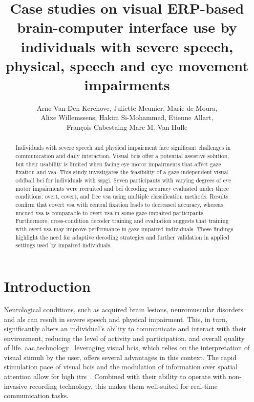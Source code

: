 \documentclass[twocolumn]{article}
\author{
	Arne Van Den Kerchove,
	Juliette Meunier,
	Marie de Moura, \\
	Alixe Willemssens,
	Hakim Si-Mohammed,
	Etienne Allart, \\
	François Cabestaing
	Marc M. Van Hulle
}
\title{Case studies on visual ERP-based brain-computer interface use by
	individuals with severe speech, physical, speech and eye movement impairments}
\begin{document}
\maketitle







\begin{abstract}
	Individuals with severe speech and physical impairment face significant challenges in
	communication and	daily interaction.
	Visual \acp{bci} offer a potential assistive solution, but their usability is
	limited when facing eye motor impairments that affect gaze fixation
	and \ac{vsa}.
	This study investigates the feasibility of a gaze-independent visual oddball
	\ac{bci} for individuals with \ac{sspgi}.
	Seven participants with varying degrees of eye motor impairments were
	recruited and \ac{bci} decoding accuracy evaluated under three conditions:
	overt, covert, and free \ac{vsa} using multiple classification methods.
	Results confirm that covert \ac{vsa} with central fixation leads to decreased
	accuracy, whereas uncued \ac{vsa} is comparable to overt \ac{vsa} in some
	gaze-impaired participants.
	Furthermore, cross-condition decoder training and evaluation suggests that training
	with overt \ac{vsa} may improve performance in gaze-impaired individuals.
	These findings highlight the need for adaptive decoding strategies and further
	validation in applied settings used by impaired individuals.
\end{abstract}

\acresetall
\section{Introduction}
Neurological conditions, such as acquired brain lesions,
neuromuscular disorders and \ac{als} can result in severe speech and physical impairment.
This, in turn, significantly alters an individual's ability to communicate and interact
with their environment, reducing the level of activity and participation,
and overall quality of life.
\Ac{aac} technology~\cite{Ascari2018,Elsahar2019,Curtis2022} leveraging visual \acp{bci}\cite{Schultz2017, Peters2022},
which relies on the interpretation of visual stimuli by the user,
offers several advantages in this context.
The rapid stimulation pace of visual \acp{bci} and the modulation of
information over spatial attention allow for high \acp{itr}~\cite{Abiri2019,Han2023}.
Combined with their ability to operate with non-invasive recording technology,
this makes them well-suited for real-time communication tasks.
\end{document}
